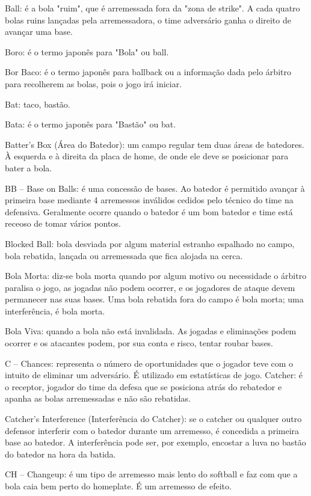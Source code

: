 Ball: é a bola "ruim", que é arremessada fora da "zona de strike". A cada quatro bolas ruins lançadas pela arremessadora, o time adversário ganha o direito de avançar uma base.

Boro: é o termo japonês para "Bola" ou \gls{ball}.

Bor Baco: é o termo japonês para \gls{ballback} ou a informação dada pelo árbitro para recolherem as bolas, pois o jogo irá iniciar.

Bat: taco, bastão.

Bata: é o termo japonês para "Bastão" ou \gls{bat}.

Batter's Box (Área do Batedor): um campo regular tem duas áreas de batedores. À esquerda e à direita da placa de home, de onde ele deve se posicionar para bater a bola.

BB -- Base on Balls: é uma concessão de bases. Ao batedor é permitido avançar à primeira base mediante 4 arremessos inválidos cedidos pelo técnico do time na defensiva. Geralmente ocorre quando o batedor é um bom batedor e time está receoso de tomar vários pontos.

Blocked Ball: bola desviada por algum material estranho espalhado no campo, bola rebatida, lançada ou arremessada que fica alojada na cerca.

Bola Morta: diz-se bola morta quando por algum motivo ou necessidade o árbitro paralisa o jogo, as jogadas não podem ocorrer, e os jogadores de ataque devem permanecer nas suas bases. Uma bola rebatida fora do campo é bola morta; uma interferência, é bola morta.

Bola Viva: quando a bola não está invalidada. As jogadas e eliminações podem ocorrer e os atacantes podem, por sua conta e risco, tentar roubar bases.

C -- Chances: representa o número de oportunidades que o jogador teve com o intuito de eliminar um adversário. É utilizado em estatísticas de jogo.
Catcher: é o receptor, jogador do time da defesa que se posiciona atrás do rebatedor e apanha as bolas arremessadas e não são rebatidas.

Catcher's Interference (Interferência do Catcher): se o catcher ou qualquer outro defensor interferir com o batedor durante um arremesso, é concedida a primeira base ao batedor. A interferência pode ser, por exemplo, encostar a luva no bastão do batedor na hora da batida.

CH -- Changeup: é um tipo de arremesso mais lento do softball e faz com que a bola caia bem perto do \gls{homeplate}. É um arremesso de efeito.

